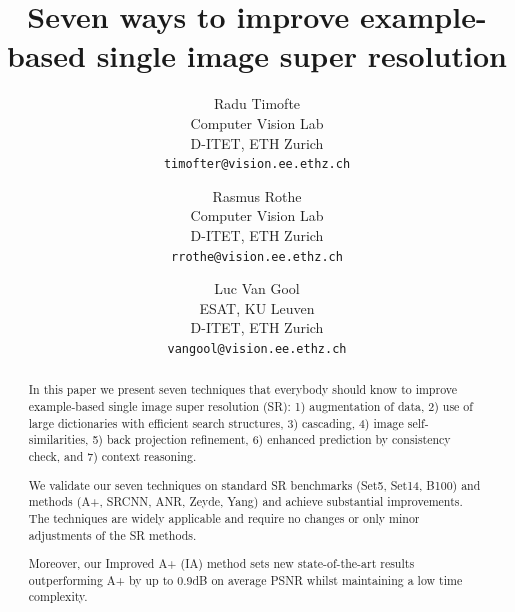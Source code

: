 \documentclass[10pt,twocolumn,letterpaper]{article}
\begin{document}
\title{Seven ways to improve example-based single image super resolution}

\author{Radu Timofte\\
Computer Vision Lab\\
D-ITET, ETH Zurich\\
{\tt\small timofter@vision.ee.ethz.ch}
\and
Rasmus Rothe\\
Computer Vision Lab\\
D-ITET, ETH Zurich\\
{\tt\small rrothe@vision.ee.ethz.ch}
\and
Luc Van Gool\\
ESAT, KU Leuven\\
D-ITET, ETH Zurich\\
{\tt\small vangool@vision.ee.ethz.ch}
}
\maketitle


\begin{abstract}
In this paper we present seven techniques that everybody should know to improve example-based single image super resolution (SR): 1) augmentation of data, 2) use of large dictionaries with efficient search structures, 3) cascading, 4) image self-similarities, 5) back projection refinement, 6) enhanced prediction by consistency check, and 7) context reasoning.

We validate our seven techniques on standard SR benchmarks (\ie Set5, Set14, B100) and methods (\ie A+, SRCNN, ANR, Zeyde, Yang) and achieve substantial improvements.
The techniques are widely applicable and require no changes or only minor adjustments of the SR methods. 

Moreover, our Improved A+ (IA) method sets new state-of-the-art results outperforming A+ by up to 0.9dB on average PSNR whilst maintaining a low time complexity.
\end{abstract}
\end{document}
